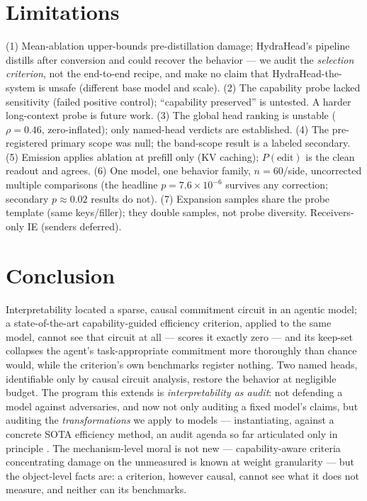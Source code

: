 \documentclass[11pt]{article}
\begin{document}
\section{Limitations}\label{sec:limitations}

(1) Mean-ablation upper-bounds pre-distillation damage; HydraHead's pipeline distills after conversion and
could recover the behavior --- we audit the \emph{selection criterion}, not the end-to-end recipe, and make
no claim that HydraHead-the-system is unsafe (different base model and scale).
(2) The capability probe lacked sensitivity (failed positive control); ``capability preserved'' is
untested. A harder long-context probe is future work.
(3) The global head ranking is unstable ($\rho{=}0.46$, zero-inflated); only named-head verdicts are
established.
(4) The pre-registered primary scope was null; the band-scope result is a labeled secondary.
(5) Emission applies ablation at prefill only (KV caching); $P(\text{edit})$ is the clean readout and
agrees.
(6) One model, one behavior family, $n{=}60$/side, uncorrected multiple comparisons (the headline
$p{=}7.6{\times}10^{-6}$ survives any correction; secondary $p{\approx}0.02$ results do not).
(7) Expansion samples share the probe template (same keys/filler); they double samples, not probe
diversity. Receivers-only IE (senders deferred).

\section{Conclusion}

Interpretability located a sparse, causal commitment circuit in an agentic model; a state-of-the-art
capability-guided efficiency criterion, applied to the same model, cannot see that circuit at all ---
scores it exactly zero --- and its keep-set collapses the agent's task-appropriate commitment more
thoroughly than chance would, while the criterion's own benchmarks register nothing. Two named heads,
identifiable only by causal circuit analysis, restore the behavior at negligible budget. The program this
extends is \emph{interpretability as audit}: not defending a model against adversaries, and now not only
auditing a fixed model's claims, but auditing the \emph{transformations} we apply to models ---
instantiating, against a concrete SOTA efficiency method, an audit agenda so far articulated only in
principle \citep{aigi2026agenda,makemi2026}. The mechanism-level moral is not new --- capability-aware
criteria concentrating damage on the unmeasured is known at weight granularity \citep{wei2024brittleness}
--- but the object-level facts are: a criterion, however causal, cannot see what it does not measure,
and neither can its benchmarks.
\end{document}
